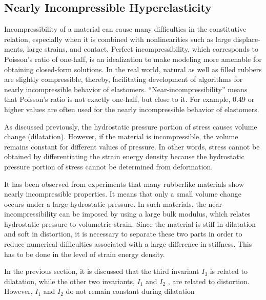 \subsection{Nearly Incompressible Hyperelasticity}
Incompressibility of a material can cause many difﬁculties in the constitutive
relation, especially when it is combined with nonlinearities such as large displace-
ments, large strains, and contact. Perfect incompressibility, which corresponds to
Poisson’s ratio of one-half, is an idealization to make modeling more amenable for
obtaining closed-form solutions. In the real world, natural as well as ﬁlled rubbers
are slightly compressible, thereby, facilitating development of algorithms for nearly
incompressible behavior of elastomers. “Near-incompressibility” means that
Poisson’s ratio is not exactly one-half, but close to it. For example, 0.49 or higher
values are often used for the nearly incompressible behavior of elastomers.

As discussed previously, the hydrostatic pressure portion of stress causes volume
change (dilatation). However, if the material is incompressible, the volume remains
constant for different values of pressure. In other words, stress cannot be obtained
by differentiating the strain energy density because the hydrostatic pressure portion
of stress cannot be determined from deformation.

It has been observed from experiments that many rubberlike materials show
nearly incompressible properties. It means that only a small volume change occurs
under a large hydrostatic pressure. In such materials, the near-incompressibility can
be imposed by using a large bulk modulus, which relates hydrostatic pressure to
volumetric strain. Since the material is stiff in dilatation and soft in distortion, it is
necessary to separate these two parts in order to reduce numerical difﬁculties
associated with a large difference in stiffness. This has to be done in the level of
strain energy density.

In the previous section, it is discussed that the third invariant $I _3$ is related to
dilatation, while the other two invariants, $I_ 1$ and $I _2$ , are related to distortion.
However, $I _1$ and $I _2$ do not remain constant during dilatation